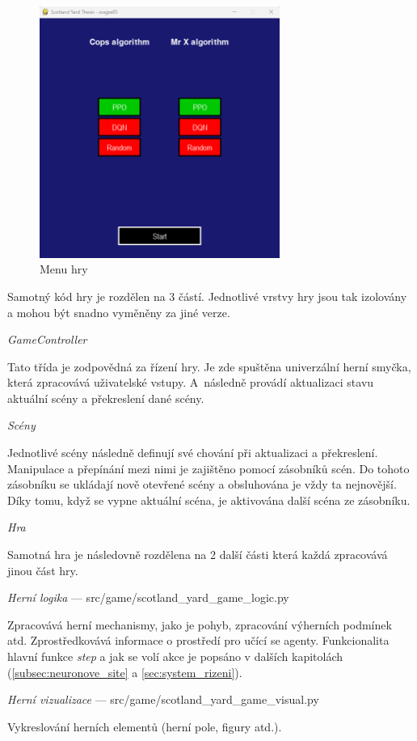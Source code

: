 \begin{figure}[H]
	\centering
	\includegraphics[width=0.7\textwidth]{obrazky-figures/game_title}
	\caption{Menu hry}\label{fig:game_title}
\end{figure}

Samotný kód hry je rozdělen na 3 částí.
Jednotlivé vrstvy hry jsou tak izolovány a mohou být snadno vyměněny za jiné verze.

\begin{myitemize}
  \item \emph{GameController}~\cite{GameSceneController}
  
  Tato třída je zodpovědná za řízení hry.
  Je zde spuštěna univerzální herní smyčka, která zpracovává uživatelské vstupy.
  A~následně provádí aktualizaci stavu aktuální scény a překreslení dané scény.
  \item \emph{Scény}~\cite{GameSceneController}
  
  Jednotlivé scény následně definují své chování při aktualizaci a překreslení.
  Manipulace a přepínání mezi nimi je zajištěno pomocí zásobníků scén.
  Do tohoto zásobníku se ukládají nově otevřené scény a obsluhována je vždy ta nejnovější.
  Díky tomu, když se vypne aktuální scéna, je aktivována další scéna ze zásobníku.

  \item \emph{Hra}

    Samotná hra je následovně rozdělena na 2 další části která každá zpracovává jinou část hry.
    \begin{myitemize}
      \item \emph{Herní logika} --- src/game/scotland\_yard\_game\_logic.py

      Zpracovává herní mechanismy, jako je pohyb, zpracování výherních podmínek atd.
      Zprostředkovává informace o prostředí pro učící se agenty.
      Funkcionalita hlavní funkce \emph{step} a jak se volí akce je popsáno v dalších kapitolách (\ref{subsec:neuronove_site} a \ref{sec:system_rizeni}).

      \item \emph{Herní vizualizace} ---  src/game/scotland\_yard\_game\_visual.py

      Vykreslování herních elementů (herní pole, figury atd.).
    \end{myitemize}
\end{myitemize}

